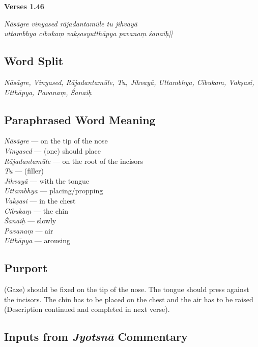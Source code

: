\noindent \textbf{Verses 1.46}

\begin{shloka}
\textit{Nāsāgre vinyased rājadantamūle tu jihvayā\\
uttambhya cibukaṃ vakṣasyutthāpya pavanaṃ śanaiḥ||}
\end{shloka}

\subsection*{Word Split}

\textit{Nāsāgre, Vinyased, Rājadantamūle, Tu, Jihvayā, Uttambhya, Cibukam, Vakṣasi, Utthāpya, Pavanaṃ, Śanaiḥ}

\subsection*{Paraphrased Word Meaning}

\begin{multicols}{2}
\textit{Nāsāgre} ---  on the tip of the nose \\
\textit{Vinyased} --- (one) should place  \\
\textit{Rājadantamūle} ---  on the root of the incisors   \\
\textit{Tu} --- (filler)  \\
\textit{Jihvayā} --- with the tongue \\
\textit{Uttambhya} ---  placing/propping \\
\textit{Vakṣasi} --- in the chest  \\
\textit{Cibukaṃ} ---  the chin  \\
\textit{Śanaiḥ} --- slowly  \\
\textit{Pavanaṃ} ---   air  \\
\textit{Utthāpya} --- arousing
\end{multicols}

\subsection*{Purport}

(Gaze) should be fixed on the tip of the nose. The tongue should press against the incisors. The chin has to be placed on the chest and the air has to be raised (Description continued and completed in next verse).

\subsection*{Inputs from \textit{Jyotsnā} Commentary}

